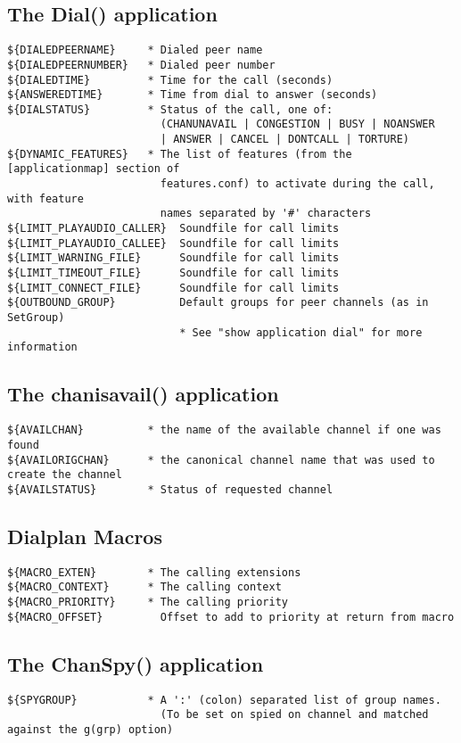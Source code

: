 \subsection{The Dial() application}
\begin{verbatim}
${DIALEDPEERNAME}     * Dialed peer name
${DIALEDPEERNUMBER}   * Dialed peer number
${DIALEDTIME}         * Time for the call (seconds)
${ANSWEREDTIME}       * Time from dial to answer (seconds)
${DIALSTATUS}         * Status of the call, one of:
                        (CHANUNAVAIL | CONGESTION | BUSY | NOANSWER 
                        | ANSWER | CANCEL | DONTCALL | TORTURE)
${DYNAMIC_FEATURES}   * The list of features (from the [applicationmap] section of
                        features.conf) to activate during the call, with feature
                        names separated by '#' characters
${LIMIT_PLAYAUDIO_CALLER}  Soundfile for call limits
${LIMIT_PLAYAUDIO_CALLEE}  Soundfile for call limits
${LIMIT_WARNING_FILE}      Soundfile for call limits
${LIMIT_TIMEOUT_FILE}      Soundfile for call limits
${LIMIT_CONNECT_FILE}      Soundfile for call limits
${OUTBOUND_GROUP}          Default groups for peer channels (as in SetGroup)
                           * See "show application dial" for more information
\end{verbatim}

\subsection{The chanisavail() application}
\begin{verbatim}
${AVAILCHAN}          * the name of the available channel if one was found  
${AVAILORIGCHAN}      * the canonical channel name that was used to create the channel
${AVAILSTATUS}        * Status of requested channel
\end{verbatim}

\subsection{Dialplan Macros}
\begin{verbatim}
${MACRO_EXTEN}        * The calling extensions
${MACRO_CONTEXT}      * The calling context
${MACRO_PRIORITY}     * The calling priority
${MACRO_OFFSET}         Offset to add to priority at return from macro
\end{verbatim}

\subsection{The ChanSpy() application}
\begin{verbatim}
${SPYGROUP}           * A ':' (colon) separated list of group names.
                        (To be set on spied on channel and matched against the g(grp) option)
\end{verbatim}

